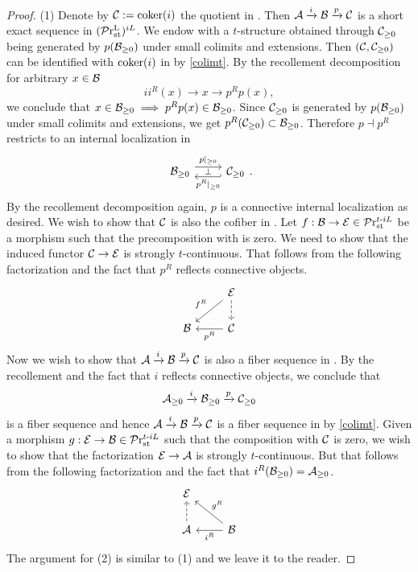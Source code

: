 \documentclass[a4paper,10pt, oneside]{amsart}
\begin{document}
	\begin{proof}
		(1) Denote by $\mathcal{C}:=\mathrm{coker}(i)$ the quotient in \prlst. Then $\mathcal{A}\xrightarrow{i}\mathcal{B} \xrightarrow{p}\mathcal{C}$ is a short exact sequence in $(\mathcal{P}\mathrm{r}_{\mathrm{st}}^\mathrm{L})^{iL}$. We endow \mcc with a $t$-structure obtained through $\mathcal{C}_{\geq 0}$ being generated by $p(\mathcal{B}_{\geq 0})$ under small colimits and extensions. Then $(\mathcal{C},\mathcal{C}_{\geq 0})$ can be identified with $\mathrm{coker}(i)$ in \prtrex by \cref{colimt}. By the recollement decomposition for arbitrary $x\in\mathcal{B}$ $$ii^R(x)\to x \to p^Rp(x),$$ 
		we conclude that $x\in \mathcal{B}_{\geq 0} \implies p^Rp(x)\in \mathcal{B}_{\geq 0}$. Since $\mathcal{C}_{\geq 0}$ is generated by $p(\mathcal{B}_{\geq 0})$ under small colimits and extensions, we get $p^R(\mathcal{C}_{\geq 0})\subset \mathcal{B}_{\geq 0}$. Therefore $p\dashv p^R$ restricts to an internal localization in \prlad
		$$\begin{tikzcd}
			\mcb_{\geq0} \arrow[r, "p|_{\geq0}", shift left=1ex]   & \arrow[l,"p^R|_{\geq0}","\perp"', hook', shift left=1ex] \mcc_{\geq0}
		\end{tikzcd}.$$
		By the recollement decomposition again, $p$ is a connective internal localization as desired.
		We wish to show that $\mathcal{C}$ is also the cofiber in \prtil. 
		Let $f:\mathcal{B}\to\mathcal{E} \in \mathcal{P}\mathrm{r}^{t\text{-}iL}_{\mathrm{st}}$ be a morphism such that the precomposition with \mca is zero. We need to show that the induced functor $\mathcal{C}\to \mathcal{E}$ is strongly $t$-continuous. That follows from the following factorization and the fact that $p^R$ reflects connective objects.
		$$\begin{tikzcd}
			& \mce \arrow[ld, "f^R"'] \arrow[d, dashed] \\
			\mcb & \mcc \arrow[l, "p^R"]                   
		\end{tikzcd}$$
		Now we wish to show that $\mathcal{A}\xrightarrow{i}\mathcal{B} \xrightarrow{p}\mathcal{C}$ is also a fiber sequence in \prtil. By the recollement and the fact that $i$ reflects connective objects, we conclude that $$\mathcal{A}_{\geq0}\xrightarrow{i}\mathcal{B}_{\geq0} \xrightarrow{p}\mathcal{C}_{\geq0}$$ is a fiber sequence and hence $\mathcal{A}\xrightarrow{i}\mathcal{B} \xrightarrow{p}\mathcal{C}$ is a fiber sequence in \prtrex by \cref{colimt}. Given a morphism $g:\mathcal{E} \to \mathcal{B} \in\mathcal{P}\mathrm{r}^{t\text{-}iL}_{\mathrm{st}}$ such that the composition with $\mathcal{C}$ is zero, we wish to show that the factorization $\mathcal{E} \to \mathcal{A}$ is strongly $t$-continuous. But that follows from the following factorization and the fact that $i^R(\mathcal{B}_{\geq 0})=\mathcal{A}_{\geq 0}$.
		$$\begin{tikzcd}
			\mce                   &                                          \\
			\mca \arrow[u, dashed] & \mcb \arrow[l, "i^R"] \arrow[lu, "g^R"']
		\end{tikzcd}$$
		The argument for (2) is similar to (1) and we leave it to the reader.
	\end{proof}
\end{document}
